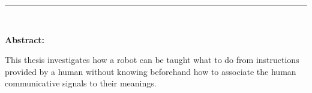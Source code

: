 
\begin{vcenterpage}
\noindent\rule[2pt]{\textwidth}{0.5pt}
\begin{center}
{\large\textbf{\thesistitle\\}}
\end{center}
{\large\textbf{Abstract:}} 

This thesis investigates how a robot can be taught what to do from instructions provided by a human without knowing beforehand how to associate the human communicative signals to their meanings.





\end{vcenterpage}
